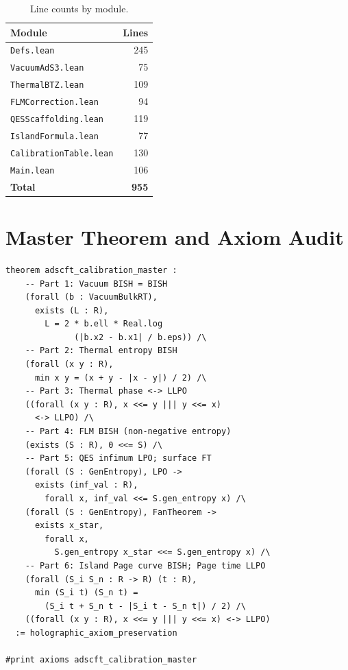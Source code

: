 \documentclass[11pt,a4paper]{article}
\theoremstyle{plain}
\theoremstyle{definition}
\begin{document}
\begin{table}[ht]
\centering
\begin{tabular}{@{}lr@{}}
\toprule
\textbf{Module} & \textbf{Lines} \\
\midrule
\texttt{Defs.lean} & 245 \\
\texttt{VacuumAdS3.lean} & 75 \\
\texttt{ThermalBTZ.lean} & 109 \\
\texttt{FLMCorrection.lean} & 94 \\
\texttt{QESScaffolding.lean} & 119 \\
\texttt{IslandFormula.lean} & 77 \\
\texttt{CalibrationTable.lean} & 130 \\
\texttt{Main.lean} & 106 \\
\midrule
\textbf{Total} & \textbf{955} \\
\bottomrule
\end{tabular}
\caption{Line counts by module.}
\label{tab:lines}
\end{table}

\section{Master Theorem and Axiom Audit}\label{sec:master}

\begin{lstlisting}[caption={Master theorem: \texttt{Main.lean}}]
theorem adscft_calibration_master :
    -- Part 1: Vacuum BISH = BISH
    (forall (b : VacuumBulkRT),
      exists (L : R),
        L = 2 * b.ell * Real.log
              (|b.x2 - b.x1| / b.eps)) /\
    -- Part 2: Thermal entropy BISH
    (forall (x y : R),
      min x y = (x + y - |x - y|) / 2) /\
    -- Part 3: Thermal phase <-> LLPO
    ((forall (x y : R), x <<= y ||| y <<= x)
      <-> LLPO) /\
    -- Part 4: FLM BISH (non-negative entropy)
    (exists (S : R), 0 <<= S) /\
    -- Part 5: QES infimum LPO; surface FT
    (forall (S : GenEntropy), LPO ->
      exists (inf_val : R),
        forall x, inf_val <<= S.gen_entropy x) /\
    (forall (S : GenEntropy), FanTheorem ->
      exists x_star,
        forall x,
          S.gen_entropy x_star <<= S.gen_entropy x) /\
    -- Part 6: Island Page curve BISH; Page time LLPO
    (forall (S_i S_n : R -> R) (t : R),
      min (S_i t) (S_n t) =
        (S_i t + S_n t - |S_i t - S_n t|) / 2) /\
    ((forall (x y : R), x <<= y ||| y <<= x) <-> LLPO)
  := holographic_axiom_preservation

#print axioms adscft_calibration_master
\end{lstlisting}
\end{document}
